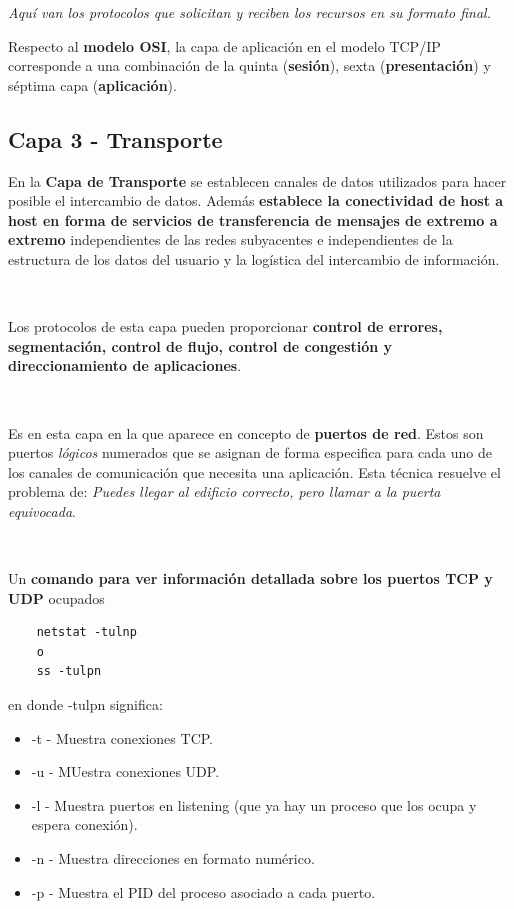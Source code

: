\documentclass[a4paper,10pt]{article}
\begin{document}
\begin{center}
    \textit{Aquí van los protocolos que solicitan y reciben los recursos en su formato final.}
\end{center}


Respecto al \textbf{modelo OSI}, la capa de aplicación en el modelo TCP/IP corresponde a una combinación de la quinta (\textbf{sesión}), sexta (\textbf{presentación}) y séptima capa (\textbf{aplicación}).



\subsection{Capa 3 - Transporte}
En la \textbf{Capa de Transporte} se establecen canales de datos utilizados para hacer posible el intercambio de datos. 
Además \textbf{establece la conectividad de host a host en forma de servicios de transferencia de mensajes de extremo a extremo} independientes de las redes subyacentes e independientes de la 
estructura de los datos del usuario y la logística del intercambio de información.

\

Los protocolos de esta capa pueden proporcionar \textbf{control de errores, segmentación, control de flujo, control de congestión y direccionamiento de aplicaciones}.

\

Es en esta capa en la que aparece en concepto de \textbf{puertos de red}. Estos son puertos \textit{lógicos} numerados que se asignan de forma especifica para cada uno de los
canales de comunicación que necesita una aplicación. Esta técnica resuelve el problema de: \textit{Puedes llegar al edificio correcto, pero llamar a la puerta equivocada}.

\

Un \textbf{comando para ver información detallada sobre los puertos TCP y UDP} ocupados

\begin{center}
    \begin{lstlisting}
    netstat -tulnp
    o
    ss -tulpn
    \end{lstlisting}
\end{center}

en donde -tulpn significa:

\begin{itemize}
    \item -t - Muestra conexiones TCP.
    \item -u - MUestra conexiones UDP.
    \item -l - Muestra puertos en listening (que ya hay un proceso que los ocupa y espera conexión).
    \item -n - Muestra direcciones en formato numérico.
    \item -p - Muestra el PID del proceso asociado a cada puerto.
\end{itemize}
\end{document}
